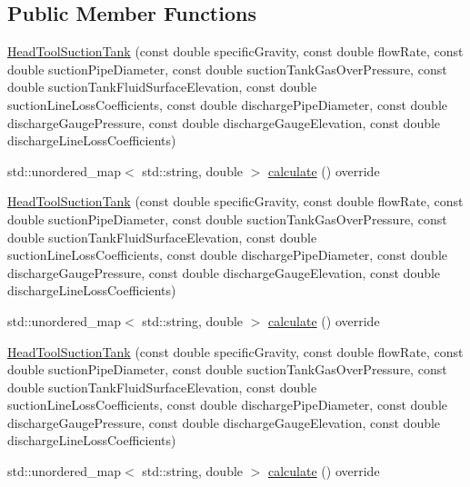 \subsection*{Public Member Functions}
\begin{DoxyCompactItemize}
\item 
\hyperlink{class_head_tool_suction_tank_a96579ecd414c723362db00cfeb24cd46}{Head\+Tool\+Suction\+Tank} (const double specific\+Gravity, const double flow\+Rate, const double suction\+Pipe\+Diameter, const double suction\+Tank\+Gas\+Over\+Pressure, const double suction\+Tank\+Fluid\+Surface\+Elevation, const double suction\+Line\+Loss\+Coefficients, const double discharge\+Pipe\+Diameter, const double discharge\+Gauge\+Pressure, const double discharge\+Gauge\+Elevation, const double discharge\+Line\+Loss\+Coefficients)
\item 
std\+::unordered\+\_\+map$<$ std\+::string, double $>$ \hyperlink{class_head_tool_suction_tank_a390a38466222aa3b87d2cf2ec84537a5}{calculate} () override
\item 
\hyperlink{class_head_tool_suction_tank_a96579ecd414c723362db00cfeb24cd46}{Head\+Tool\+Suction\+Tank} (const double specific\+Gravity, const double flow\+Rate, const double suction\+Pipe\+Diameter, const double suction\+Tank\+Gas\+Over\+Pressure, const double suction\+Tank\+Fluid\+Surface\+Elevation, const double suction\+Line\+Loss\+Coefficients, const double discharge\+Pipe\+Diameter, const double discharge\+Gauge\+Pressure, const double discharge\+Gauge\+Elevation, const double discharge\+Line\+Loss\+Coefficients)
\item 
std\+::unordered\+\_\+map$<$ std\+::string, double $>$ \hyperlink{class_head_tool_suction_tank_a7e4a6931caa7c9be43992aecdfb80bec}{calculate} () override
\item 
\hyperlink{class_head_tool_suction_tank_a96579ecd414c723362db00cfeb24cd46}{Head\+Tool\+Suction\+Tank} (const double specific\+Gravity, const double flow\+Rate, const double suction\+Pipe\+Diameter, const double suction\+Tank\+Gas\+Over\+Pressure, const double suction\+Tank\+Fluid\+Surface\+Elevation, const double suction\+Line\+Loss\+Coefficients, const double discharge\+Pipe\+Diameter, const double discharge\+Gauge\+Pressure, const double discharge\+Gauge\+Elevation, const double discharge\+Line\+Loss\+Coefficients)
\item 
std\+::unordered\+\_\+map$<$ std\+::string, double $>$ \hyperlink{class_head_tool_suction_tank_a7e4a6931caa7c9be43992aecdfb80bec}{calculate} () override
\end{DoxyCompactItemize}


